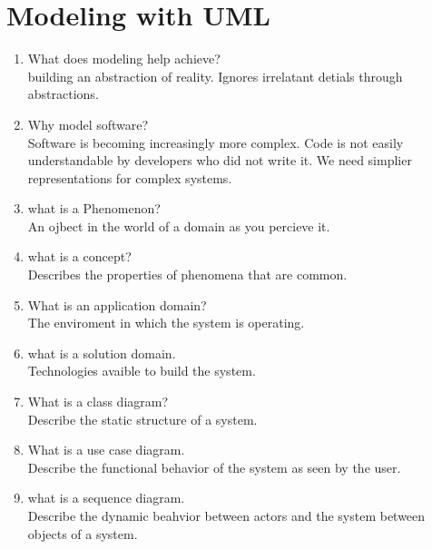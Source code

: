 \documentclass[10pt]{article}
\begin{document}
\section{Modeling with UML}
\begin{enumerate}
      \item What does modeling help achieve?\\
            building an abstraction of reality. Ignores irrelatant detials through abstractions.\\

      \item Why model software?\\
            Software is becoming increasingly more complex. Code is not easily understandable by developers who did not write it. We need
            simplier representations for complex systems.\\

      \item what is a Phenomenon?\\
            An ojbect in the world of a domain as you percieve it.\\

      \item what is a concept?\\
            Describes the properties of phenomena that are common.\\

      \item What is an application domain?\\
            The enviroment in which the system is operating.\\

      \item what is a solution domain.\\
            Technologies avaible to build the system.\\

      \item What is a class diagram?\\
            Describe the static structure of a system.\\
      \item What is a use case diagram.\\
            Describe the functional behavior of the system as seen by the user.\\
      \item what is a sequence diagram.\\
            Describe the dynamic beahvior between actors and the system between objects of a system.\\


\end{enumerate}
\end{document}
